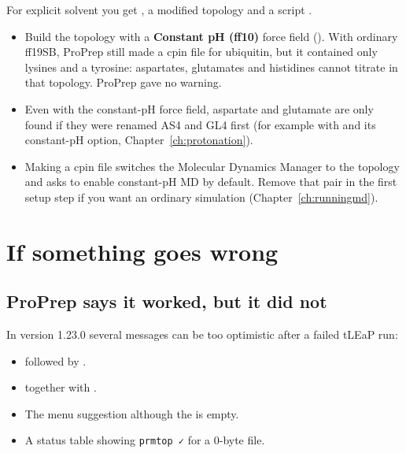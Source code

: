 For explicit solvent you get , a modified topology
 and a script .

\begin{watchout}
\begin{itemize}
  \item Build the topology with a \textbf{Constant pH (ff10)} force field
        (). With ordinary ff19SB, ProPrep still made a cpin file for
        ubiquitin, but it contained only lysines and a tyrosine: aspartates,
        glutamates and histidines cannot titrate in that topology. ProPrep
        gave no warning.
  \item Even with the constant-pH force field, aspartate and glutamate are
        only found if they were renamed AS4 and GL4 first (for example with
         and its constant-pH option, Chapter~\ref{ch:protonation}).
  \item Making a cpin file switches the Molecular Dynamics Manager to the
         topology and asks to enable constant-pH MD by
        default. Remove that pair in the first setup step if you want an
        ordinary simulation (Chapter~\ref{ch:runningmd}).
\end{itemize}
\end{watchout}

\section{If something goes wrong}\label{sec:topology-problems}

\subsection{ProPrep says it worked, but it did not}

In version 1.23.0 several messages can be too optimistic after a failed
tLEaP run:

\begin{itemize}
  \item {} followed by .
  \item {} together with
        .
  \item The menu suggestion  although the  is empty.
  \item A status table showing \texttt{prmtop ✓} for a 0-byte file.
\end{itemize}

